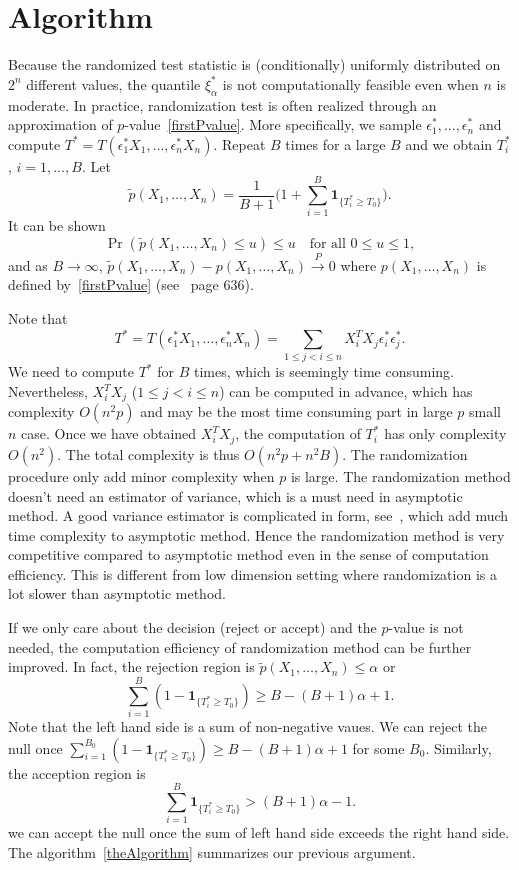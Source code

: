 \documentclass[review]{elsarticle}
\theoremstyle{plain}
\theoremstyle{definition}
\theoremstyle{remark}
\begin{document}
\section{Algorithm}

Because the randomized test statistic is (conditionally) uniformly distributed on $2^n$ different values, the quantile $\xi^*_\alpha$ is not computationally feasible even when $n$ is moderate.
In practice, randomization test is often realized through an approximation of $p$-value~\eqref{firstPvalue}.
More specifically, we sample  $\epsilon_1^*,\ldots,\epsilon_n^*$ and compute $T^*=T(\epsilon_1^* X_1,\ldots,\epsilon_n^* X_n)$.
Repeat $B$ times for a large $B$ and we obtain $T_i^*$, $i=1,\ldots,B$.
Let 
$$\tilde{p}(X_1,\ldots,X_n)=\frac{1}{B+1}\big(1+\sum_{i=1}^B \mathbf{1}_{\{T_i^*\geq T_0\}}\big).$$
It can be shown 
$$
\Pr(\tilde{p}(X_1,\ldots,X_n)\leq u)\leq u\quad \textrm{for all $0\leq u\leq 1$},
$$
and as $B\to \infty$, $\tilde{p}(X_1,\ldots,X_n)-p(X_1,\ldots,X_n)\xrightarrow{P}0$ where $p(X_1,\ldots,X_n)$ is defined by~\eqref{firstPvalue} (see~\cite{Lehmann} page $636$).

Note that 
$$
T^*=T(\epsilon_1^* X_1,\ldots,\epsilon_n^* X_n)
=\sum_{1\leq j<i \leq n}X_i^T X_j \epsilon_i^* \epsilon_j^*.
$$
We need to compute $T^*$ for $B$ times, which is seemingly time consuming.
Nevertheless,  $X_i^T X_j$ ($1\leq j<i\leq n$) can be computed in advance, which has complexity $O(n^2 p)$ and may be the most time consuming part in large $p$ small $n$ case.
Once we have obtained $X_i^T X_j$, the computation of $T_i^*$ has only complexity $O(n^2)$.
The total complexity is thus $O(n^2 p+n^2 B)$.
The randomization procedure only add minor complexity when $p$ is large.
The randomization method doesn't need an estimator of variance, which is a must need in asymptotic method. 
A good variance estimator is complicated in form, see~\cite{Chen2010A}, which add much time complexity to asymptotic method.
Hence the randomization method is very competitive compared to asymptotic method even in the sense of computation efficiency.
This is different from low dimension setting where randomization is a lot slower than asymptotic method.

If we only care about the decision (reject or accept) and the $p$-value is not needed, the computation efficiency of randomization method can be further improved.
In fact, the rejection region is $\tilde{p}(X_1,\ldots, X_n)\leq \alpha$ or
$$\sum_{i=1}^B (1-\mathbf{1}_{\{T_i^*\geq T_0\}})\geq B-(B+1)\alpha +1.$$
Note that the left hand side is a sum of non-negative vaues. We can reject the null once $\sum_{i=1}^{B_0} (1-\mathbf{1}_{\{T_i^*\geq T_0\}})\geq B-(B+1)\alpha +1$ for some $B_0$.
Similarly, the acception region is
$$\sum_{i=1}^B \mathbf{1}_{\{T_i^*\geq T_0\}}> (B+1)\alpha -1.$$
we can accept the null once the sum of left hand side exceeds the right hand side.
The algorithm~\ref{theAlgorithm} summarizes our previous argument.
\end{document}
